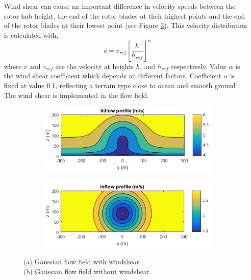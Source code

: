 Wind shear can cause an important difference in velocity speeds between the rotor hub height, the end of the rotor blades at their highest points and the end of the rotor blades at their lowest point \cite{Firtin2011} (see Figure \ref{fig:windshear}). This velocity distribution is calculated with, 
\begin{equation}
\label{eq:shear}
v = v_{ref} \left[\frac{h}{h_{ref}}\right]^\alpha
\end{equation}
where $v$ and $v_{ref}$ are the velocity at heights $h$, and $h_{ref}$  respectively. Value $\alpha$ is the wind shear coefficient which depends on different factors. Coefficient $\alpha$ is fixed at value 0.1, reflecting a terrain type close to ocean and smooth ground \cite{Firtin2011}. The wind shear is implemented in the flow field.

\begin{figure}
\centering
   \begin{subfigure}[b]{0.50\textwidth}
\includegraphics[width=\linewidth]{./Figures/PlotWindshearU6.png} %
  \caption{}
  \label{fig:windsh}
  \end{subfigure}

\begin{subfigure}[b]{0.50\textwidth}
    \includegraphics[width=\linewidth]{./Figures/PlotWithoutWindshearU6.png} %
  \caption{}
  \label{fig:nowindsh}
\end{subfigure}

\caption[Two Gaussian flow fields]{(a) Gaussian flow field with windshear. \\(b) Gaussian flow field without windshear.}
\label{fig:windshear}
\end{figure}




